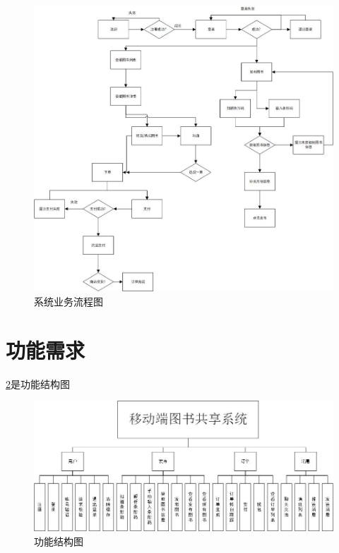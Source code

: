 \begin{figure}[h]
	\centering
	\includegraphics[scale=0.6]{Chapters/UML/system_bussness_process.jpg}
	\caption{系统业务流程图}
	\label{system_bussness_process}
\end{figure}

\section{功能需求}
\cref{function_structure}是功能结构图

\begin{figure}[h]
	\centering
	\includegraphics[scale=0.65]{Chapters/UML/function_structure.jpg}
	\caption{功能结构图}
	\label{function_structure}
\end{figure}


